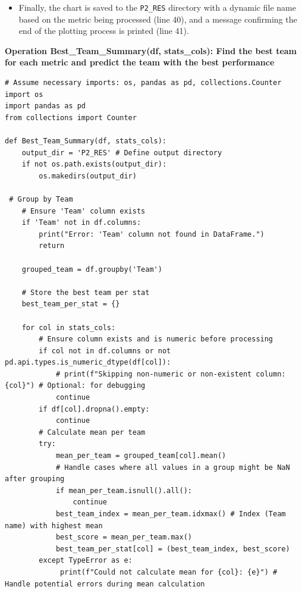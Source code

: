 \documentclass[12pt]{report}
\begin{document}
{{\begin{itemize}
\item Finally, the chart is saved to the \texttt{P2\_RES} directory with a dynamic file name based on the metric being processed (line 40), and a message confirming the end of the plotting process is printed (line 41).
\end{itemize}
\textbf* {Operation Best\_Team\_Summary(df, stats\_cols): Find the best team for each metric and predict the team with the best performance} %
\begin{lstlisting}
# Assume necessary imports: os, pandas as pd, collections.Counter
import os
import pandas as pd
from collections import Counter

def Best_Team_Summary(df, stats_cols):
    output_dir = 'P2_RES' # Define output directory
    if not os.path.exists(output_dir):
        os.makedirs(output_dir)

 # Group by Team
    # Ensure 'Team' column exists
    if 'Team' not in df.columns:
        print("Error: 'Team' column not found in DataFrame.")
        return

    grouped_team = df.groupby('Team')

    # Store the best team per stat
    best_team_per_stat = {}

    for col in stats_cols:
        # Ensure column exists and is numeric before processing
        if col not in df.columns or not pd.api.types.is_numeric_dtype(df[col]):
            # print(f"Skipping non-numeric or non-existent column: {col}") # Optional: for debugging
            continue
        if df[col].dropna().empty:
            continue
        # Calculate mean per team
        try:
            mean_per_team = grouped_team[col].mean()
            # Handle cases where all values in a group might be NaN after grouping
            if mean_per_team.isnull().all():
                continue
            best_team_index = mean_per_team.idxmax() # Index (Team name) with highest mean
            best_score = mean_per_team.max()
            best_team_per_stat[col] = (best_team_index, best_score)
        except TypeError as e:
             print(f"Could not calculate mean for {col}: {e}") # Handle potential errors during mean calculation


\end{lstlisting}}}
\end{document}
